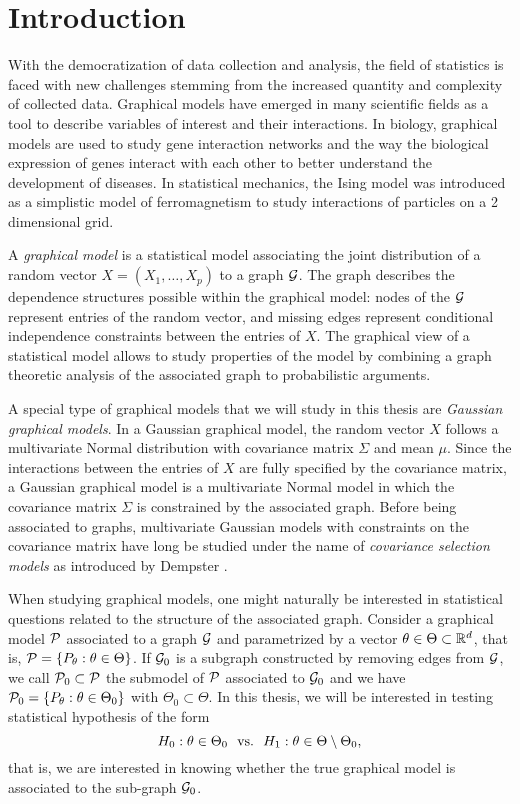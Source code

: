 \section{Introduction}

With the democratization of data collection and analysis, the field of statistics is faced with new challenges stemming from the increased quantity and complexity of collected data. Graphical models have emerged in many scientific fields as a tool to describe variables of interest and their interactions. In biology, graphical models are used to study gene interaction networks and the way the biological expression of genes interact with each other to better understand the development of diseases. In statistical mechanics, the Ising model \cite{ising1925beitrag} was introduced as a simplistic model of ferromagnetism to study interactions of particles on a 2 dimensional grid.

A \textit{graphical model} is a statistical model associating the joint distribution of a random vector $X = (X_1, \ldots, X_p)$ to a graph ${\mathcal{G}}$. The graph describes the dependence structures possible within the graphical model: nodes of the ${\mathcal{G}}$ represent entries of the random vector, and missing edges represent conditional independence constraints between the entries of $X$. The graphical view of a statistical model allows to study properties of the model by combining a graph theoretic analysis of the associated graph to probabilistic arguments.

A special type of graphical models that we will study in this thesis are \textit{Gaussian graphical models}. In a Gaussian graphical model, the random vector $X$ follows a multivariate Normal distribution with covariance matrix $\Sigma$ and mean $\mu$. Since the interactions between the entries of $X$ are fully specified by the covariance matrix, a Gaussian graphical model is a multivariate Normal model in which the covariance matrix $\Sigma$ is constrained by the associated graph. Before being associated to graphs, multivariate Gaussian models with constraints on the covariance matrix have long be studied under the name of \textit{covariance selection models} as introduced by Dempster \cite{10.2307/2528966}.

When studying graphical models, one might naturally be interested in statistical questions related to the structure of the associated graph. Consider a graphical model ${\mathcal{P}}$ associated to a graph ${\mathcal{G}}$ and parametrized by a vector $\theta \in \Theta \subset \mathbb{R}^d$, that is, ${\mathcal{P}} = {\left\{ P_\theta : \theta \in \Theta \right\}}$. If ${\mathcal{G}}_0$ is a subgraph constructed by removing edges from ${\mathcal{G}}$, we call ${\mathcal{P}}_0 \subset {\mathcal{P}}$ the submodel of ${\mathcal{P}}$ associated to ${\mathcal{G}}_0$ and we have ${\mathcal{P}}_0 = {\left\{ P_\theta : \theta \in \Theta_0 \right\}}$ with $\Theta_0 \subset \Theta$. In this thesis, we will be interested in testing statistical hypothesis of the form
\begin{equation*}
    H_0 : \theta \in \Theta_0 \ \ \t{vs.} \ \ H_1 : \theta \in \Theta \setminus \Theta_0,
\end{equation*}
that is, we are interested in knowing whether the true graphical model is associated to the sub-graph ${\mathcal{G}}_0$.


